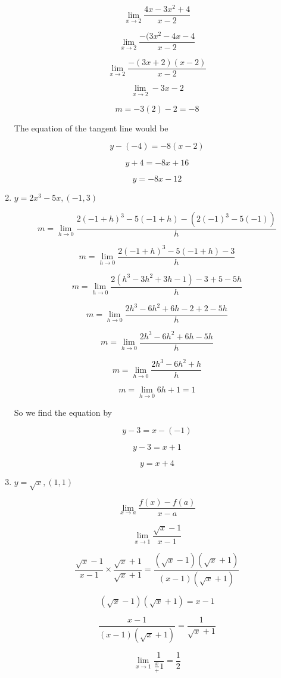\documentclass{article}
\begin{document}
\begin{enumerate}
			$$\lim \limits _{x \to 2} \frac{4x - 3x^2 + 4}{x-2}$$

			$$\lim \limits _{x \to 2} \frac{-(3x^2 - 4x - 4}{x-2}$$

			$$\lim \limits _{x \to 2} \frac{-(3x+2)(x-2)}{x-2}$$

			$$\lim \limits _{x \to 2} -3x-2$$

			$$m = -3(2) - 2 = -8$$

			The equation of the tangent line would be

			$$y - (-4) = -8(x - 2)$$

			$$y + 4 = -8x + 16$$
			
			$$y = -8x - 12$$

		\item $y = 2x^3 - 5x, (-1, 3)$

			$$m = \lim \limits _{h \to 0} \frac{2(-1+h)^3 - 5(-1+h) - (2(-1)^3 - 5(-1))}{h}$$

			$$m = \lim \limits _{h \to 0} \frac{2(-1+h)^3 - 5(-1 + h) - 3}{h}$$

			$$m = \lim \limits _{h \to 0} \frac{2(h^3 - 3h^2 + 3h -1) -3 + 5 - 5h}{h}$$

			$$m = \lim \limits _{h \to 0} \frac{2h^3 - 6h^2 + 6h -2 + 2 - 5h}{h}$$

			$$m = \lim \limits _{h \to 0} \frac{2h^3 - 6h^2 + 6h - 5h}{h}$$

			$$m = \lim \limits _{h \to 0} \frac{2h^3 - 6h^2 + h}{h}$$

			$$m = \lim \limits _{h \to 0} 6h + 1 = 1$$

			So we find the equation by

			$$y - 3 = x - (-1)$$

			$$y - 3 = x + 1$$

			$$y = x + 4$$
		\item $y = \sqrt{x}, (1,1)$

			$$\lim \limits _{x \to a} \frac{f(x) - f(a)}{x - a}$$

			$$\lim \limits _{x \to 1} \frac{\sqrt{x} - 1}{x-1}$$

			$$\frac{\sqrt{x} - 1}{x-1} \times \frac{\sqrt{x} + 1}{\sqrt{x} + 1} = 
				\frac{(\sqrt{x} - 1)(\sqrt{x} + 1)}{(x-1)(\sqrt{x}+1)}$$

			$$(\sqrt{x}-1)(\sqrt{x}+1) = x-1$$

			$$\frac{x-1}{(x-1)(\sqrt{x}+1)} = \frac{1}{\sqrt{x}+1}$$

			$$\lim \limits _{x \to 1} \frac{1}{\frac{x} + 1} = \frac{1}{2}$$


\end{enumerate}
\end{document}
